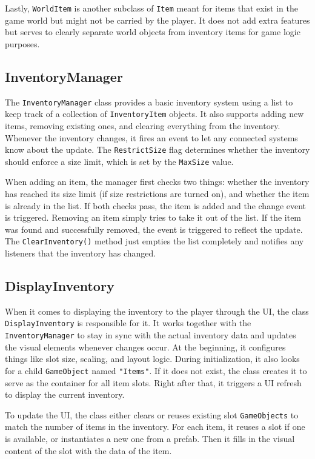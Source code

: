 Lastly, \verb|WorldItem| is another subclass of \verb|Item| meant for items that exist in the game world but might not be carried by the player. It does not add extra features but serves to clearly separate world objects from inventory items for game logic purposes.
 
\subsection{InventoryManager}
\label{InventoryManager}
The \verb|InventoryManager| class provides a basic inventory system using a list to keep track of a collection of \verb|InventoryItem| objects. It also supports adding new items, removing existing ones, and clearing everything from the inventory. Whenever the inventory changes, it fires an event to let any connected systems know about the update. The \verb|RestrictSize| flag determines whether the inventory should enforce a size limit, which is set by the \verb|MaxSize| value.

When adding an item, the manager first checks two things: whether the inventory has reached its size limit (if size restrictions are turned on), and whether the item is already in the list. If both checks pass, the item is added and the change event is triggered. Removing an item simply tries to take it out of the list. If the item was found and successfully removed, the event is triggered to reflect the update. The \verb|ClearInventory()| method just empties the list completely and notifies any listeners that the inventory has changed.

\subsection{DisplayInventory}
\label{DisplayInventory}
When it comes to displaying the inventory to the player through the UI, the class \verb|DisplayInventory| is responsible for it. It works together with the \verb|InventoryManager| to stay in sync with the actual inventory data and updates the visual elements whenever changes occur. At the beginning, it configures things like slot size, scaling, and layout logic. During initialization, it also looks for a child \verb|GameObject| named \verb|"Items"|. If it does not exist, the class creates it to serve as the container for all item slots. Right after that, it triggers a UI refresh to display the current inventory.

To update the UI, the class either clears or reuses existing slot \verb|GameObjects| to match the number of items in the inventory. For each item, it reuses a slot if one is available, or instantiates a new one from a prefab. Then it fills in the visual content of the slot with the data of the item.

